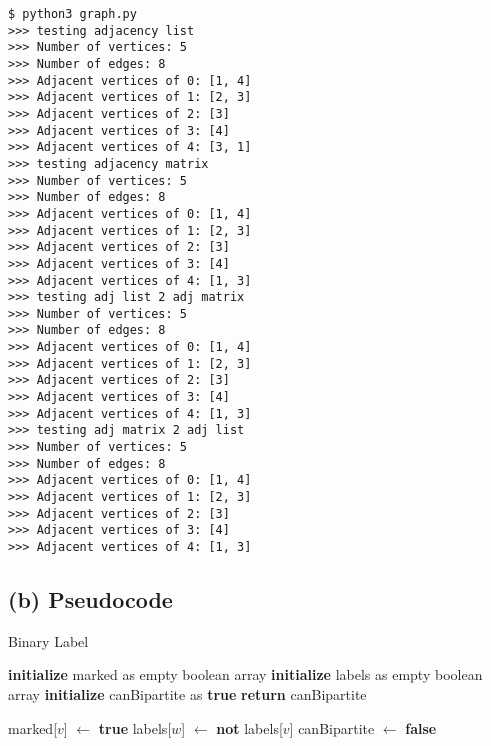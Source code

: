 \documentclass[10pt]{article}
\begin{document}
\begin{verbatim}
$ python3 graph.py
>>> testing adjacency list
>>> Number of vertices: 5
>>> Number of edges: 8
>>> Adjacent vertices of 0: [1, 4]
>>> Adjacent vertices of 1: [2, 3]
>>> Adjacent vertices of 2: [3]
>>> Adjacent vertices of 3: [4]
>>> Adjacent vertices of 4: [3, 1]
>>> testing adjacency matrix
>>> Number of vertices: 5
>>> Number of edges: 8
>>> Adjacent vertices of 0: [1, 4]
>>> Adjacent vertices of 1: [2, 3]
>>> Adjacent vertices of 2: [3]
>>> Adjacent vertices of 3: [4]
>>> Adjacent vertices of 4: [1, 3]
>>> testing adj list 2 adj matrix
>>> Number of vertices: 5
>>> Number of edges: 8
>>> Adjacent vertices of 0: [1, 4]
>>> Adjacent vertices of 1: [2, 3]
>>> Adjacent vertices of 2: [3]
>>> Adjacent vertices of 3: [4]
>>> Adjacent vertices of 4: [1, 3]
>>> testing adj matrix 2 adj list
>>> Number of vertices: 5
>>> Number of edges: 8
>>> Adjacent vertices of 0: [1, 4]
>>> Adjacent vertices of 1: [2, 3]
>>> Adjacent vertices of 2: [3]
>>> Adjacent vertices of 3: [4]
>>> Adjacent vertices of 4: [1, 3]
\end{verbatim}

\subsection*{(b) Pseudocode}

\begin{algorithm}
  \caption{Binary Label}
  \begin{algorithmic}[1]
    \State \textbf{initialize} marked as empty boolean array
    \State \textbf{initialize} labels as empty boolean array
    \State \textbf{initialize} canBipartite as \textbf{true}
    \State {}
    \EndIf
    \EndFor
    \State \textbf{return} canBipartite
    \EndFunction

    \State marked[$v$] $\gets$ \textbf{true}
    \State labels[$w$] $\gets$ \textbf{not} labels[$v$]
    \State {}
    \State canBipartite $\gets$ \textbf{false}
    \EndIf
    \EndFor
    \EndFunction
  \end{algorithmic}
\end{algorithm}
\end{document}
